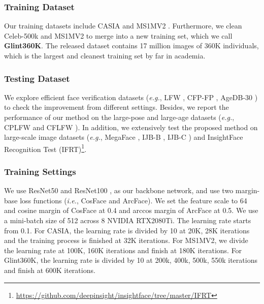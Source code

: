 \documentclass[letterpaper]{article} \usepackage{style/aaai21}  \usepackage{times}  \usepackage{helvet} \usepackage{courier}  \usepackage[hyphens]{url}  \usepackage{graphicx} \usepackage{color}
\begin{document}
\subsubsection{Training Dataset}
Our training datasets include CASIA \cite{liu2015deep} and MS1MV2 \cite{deng2019arcface}. Furthermore, we clean Celeb-500k \cite{cao2018celeb} and MS1MV2 to merge into a new training set, which we call \textbf{Glint360K}. The released dataset contains 17 million images of 360K individuals, which is the largest and cleanest training set by far in academia.

\subsubsection{Testing Dataset}
We explore efficient face verification datasets (\emph{e.g.}, LFW \cite{huang2008labeled}, CFP-FP \cite{sengupta2016frontal}, AgeDB-30 \cite{moschoglou2017agedb}) to check the improvement from different settings. Besides, we report the performance of our method on the large-pose and large-age datasets (\emph{e.g.}, CPLFW \cite{CPLFWTech} and CFLFW \cite{zheng2017cross}). In addition, we extensively test the proposed method on large-scale image datasets (\emph{e.g.}, MegaFace \cite{kemelmacher-shlizerman2016the}, IJB-B \cite{whitelam2017iarpa}, IJB-C \cite{maze2018iarpa}) and InsightFace Recognition Test (IFRT)\footnote{\url{https://github.com/deepinsight/insightface/tree/master/IFRT}}.
 


\subsubsection{Training Settings}

We use ResNet50 and ResNet100 \cite{deng2019arcface, he2016deep}, as our backbone network, and use two margin-base loss functions (\emph{i.e.}, CosFace and ArcFace). We set the feature scale  to 64 and cosine margin  of CosFace at 0.4 and arccos margin  of ArcFace at 0.5. We use a mini-batch size of 512 across 8 NVIDIA RTX2080Ti. The learning rate starts from 0.1. For CASIA, the learning rate is divided by 10 at 20K, 28K iterations and the training process is finished at 32K iterations. For MS1MV2, we divide the learning rate at 100K, 160K iterations and finish at 180K iterations. For Glint360K, the learning rate is divided by 10 at 200k, 400k, 500k, 550k iterations and finish at 600K iterations.
\end{document}
